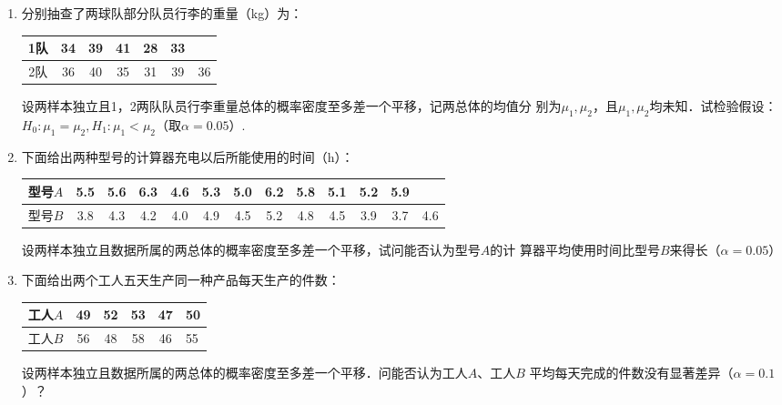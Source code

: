 \documentclass[10pt,a4paper]{article}
\begin{document}
\begin{enumerate}
    \item 分别抽查了两球队部分队员行李的重量（kg）为：   
    \renewcommand{\arraystretch}{1.3}
    \begin{table}[H]\centering
        \begin{tabular}{c|cccccc}
        1队 & 34 & 39 & 41 & 28 & 33 &    \\ \hline
        2队 & 36 & 40 & 35 & 31 & 39 & 36
        \end{tabular}
    \end{table}
    \renewcommand{\arraystretch}{1.0}
    设两样本独立且1，2两队队员行李重量总体的概率密度至多差一个平移，记两总体的均值分
    别为$\mu_1,\mu_2$，且$\mu_1,\mu_2$均未知．试检验假设：$H_0:\mu_1=\mu_2,H_1:\mu_1<\mu_2$（取$\alpha=0.05$）.




    



    \item 下面给出两种型号的计算器充电以后所能使用的时间（h）：
    \renewcommand{\arraystretch}{1.3}
    \begin{table}[H]\centering
        \begin{tabular}{c|cccccccccccc}
        型号$A$ & 5.5 & 5.6 & 6.3 & 4.6 & 5.3 & 5.0 & 6.2 & 5.8 & 5.1 & 5.2 & 5.9 &     \\ \hline
        型号$B$ & 3.8 & 4.3 & 4.2 & 4.0 & 4.9 & 4.5 & 5.2 & 4.8 & 4.5 & 3.9 & 3.7 & 4.6
        \end{tabular}
    \end{table}
    \renewcommand{\arraystretch}{1.0}
    设两样本独立且数据所属的两总体的概率密度至多差一个平移，试问能否认为型号$A$的计
    算器平均使用时间比型号$B$来得长（$\alpha=0.05$）





    \item 下面给出两个工人五天生产同一种产品每天生产的件数：
    \renewcommand{\arraystretch}{1.3}
    \begin{table}[H]\centering
        \begin{tabular}{c|ccccl}
        工人$A$ & 49 & 52 & 53 & 47 & 50 \\ \hline
        工人$B$ & 56 & 48 & 58 & 46 & 55
        \end{tabular}
    \end{table}
    \renewcommand{\arraystretch}{1.0}
    设两样本独立且数据所属的两总体的概率密度至多差一个平移．问能否认为工人$A$、工人$B$
    平均每天完成的件数没有显著差异（$\alpha=0.1$）？







\end{enumerate}
\end{document}

